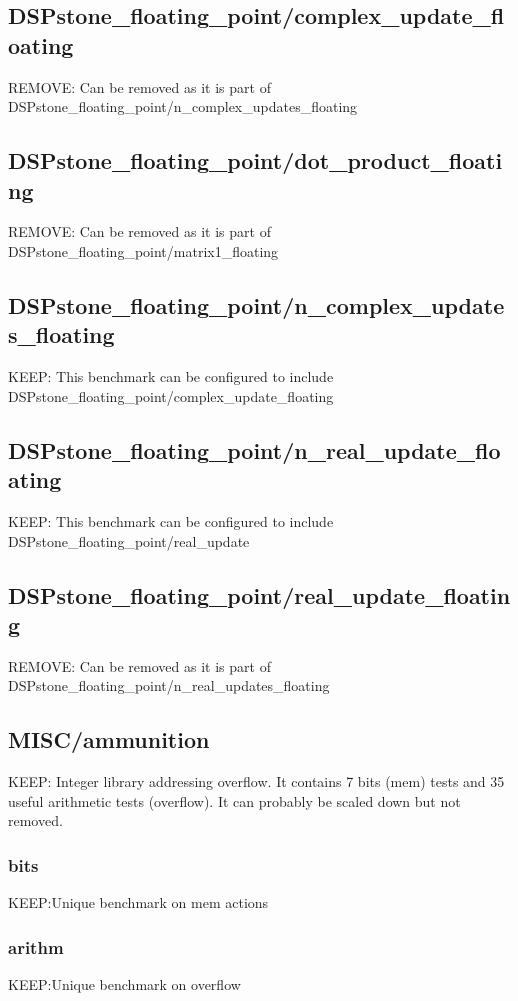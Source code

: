 \documentclass[a4paper]{article}
\begin{document}
\subsection{DSPstone\_floating\_point/complex\_update\_floating}
	REMOVE: Can be removed as it is part of DSPstone\_floating\_point/n\_complex\_updates\_floating
    
\subsection{DSPstone\_floating\_point/dot\_product\_floating}
	REMOVE: Can be removed as it is part of DSPstone\_floating\_point/matrix1\_floating

\subsection{DSPstone\_floating\_point/n\_complex\_updates\_floating}
	KEEP: This benchmark can be configured to include DSPstone\_floating\_point/complex\_update\_floating 

\subsection{DSPstone\_floating\_point/n\_real\_update\_floating}
	KEEP: This benchmark can be configured to include  DSPstone\_floating\_point/real\_update
    
\subsection{DSPstone\_floating\_point/real\_update\_floating}
	REMOVE: Can be removed as it is part of DSPstone\_floating\_point/n\_real\_updates\_floating

    
\subsection{MISC/ammunition}   
	KEEP: Integer library addressing overflow. It contains 7 bits (mem) tests and 35 useful arithmetic tests (overflow). It can probably be scaled down but not removed.
    
	\subsubsection{bits}
    	KEEP:Unique benchmark on mem actions
    \subsubsection{arithm}
    	KEEP:Unique benchmark on overflow
        
\end{document}
